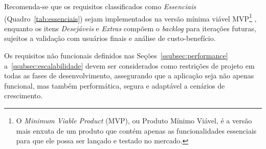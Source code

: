 Recomenda-se que os requisitos classificados como \textit{Essenciais} (Quadro~\ref{tab:essenciais}) sejam implementados na versão mínima viável \gls{MVP}\footnote{O \textit{Minimum Viable Product} (MVP), ou Produto Mínimo Viável, é a versão mais enxuta de um produto que contém apenas as funcionalidades essenciais para que ele possa ser lançado e testado no mercado.}
, enquanto os itens \textit{Desejáveis} e \textit{Extras} compõem o \textit{backlog} para iterações futuras, sujeitos a validação com usuários finais e análise de custo-benefício.

Os requisitos não funcionais definidos nas Seções~\ref{ssubsec:performance} a~\ref{ssubsec:escalabilidade} devem ser considerados como restrições de projeto em todas as fases de desenvolvimento, assegurando que a aplicação seja não apenas funcional, mas também performática, segura e adaptável a cenários de crescimento.

